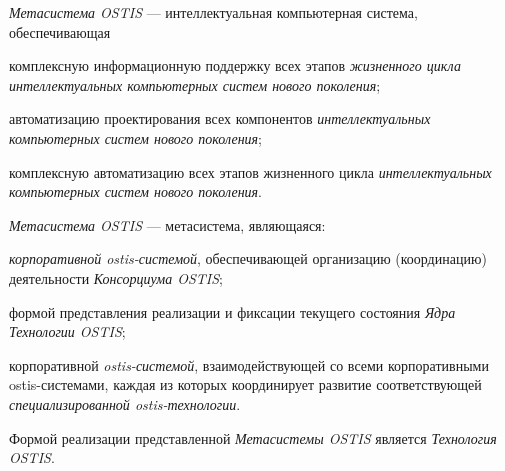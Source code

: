 \newpage

\begin{SCn}
\end{SCn}	

\textit{Метасистема OSTIS} --- интеллектуальная компьютерная система, обеспечивающая 
\begin{textitemize}
	\item комплексную информационную поддержку всех этапов \textit{жизненного цикла} \textit{интеллектуальных компьютерных систем нового поколения};
	\item автоматизацию проектирования всех компонентов \textit{интеллектуальных компьютерных систем нового поколения};
	\item комплексную автоматизацию всех этапов жизненного цикла \textit{интеллектуальных компьютерных систем нового поколения}.
\end{textitemize}

\textit{Метасистема OSTIS} --- метасистема, являющаяся:
\begin{textitemize}
\item \textit{корпоративной ostis-системой}, обеспечивающей организацию (координацию) деятельности \textit{Консорциума OSTIS};
\item формой представления реализации и фиксации текущего состояния \textit{Ядра Технологии OSTIS};
\item корпоративной \textit{ostis-системой}, взаимодействующей со всеми корпоративными ostis-системами, каждая из которых координирует развитие соответствующей \textit{специализированной ostis-технологии}.
\end{textitemize}

Формой реализации представленной \textit{Метасистемы OSTIS} является \textit{Технология OSTIS}.

